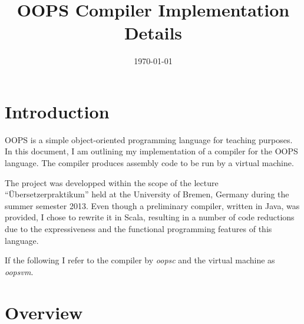 \documentclass{guide}
\title{OOPS Compiler Implementation Details}
\date{\today}
\begin{document}
\maketitle
\tableofcontents

\chapter{Introduction}
OOPS is a simple object-oriented programming language for teaching purposes. In
this document, I am outlining my implementation of a compiler for the OOPS
language. The compiler produces assembly code to be run by a virtual machine.

The project was developped within the scope of the lecture
``Übersetzerpraktikum'' held at the University of Bremen, Germany during the
summer semester 2013. Even though a preliminary compiler, written in Java, was
provided, I chose to rewrite it in Scala, resulting in a number of code
reductions due to the expressiveness and the functional programming features of
this language.

If the following I refer to the compiler by \textit{oopsc} and the virtual
machine as \textit{oopsvm}.

\chapter{Overview}
\end{document}
